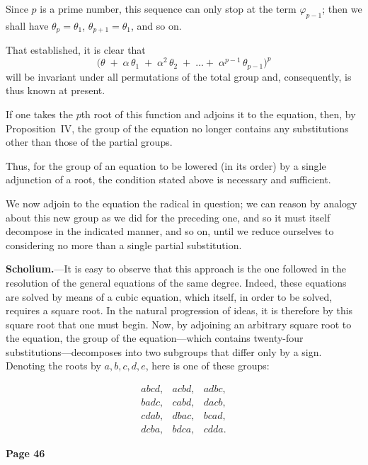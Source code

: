 \documentclass{article}
\begin{document}
\noindent
Since $p$ is a prime number, this sequence can only stop at the term $\varphi_{p-1}$; then we shall have $\theta_{p} = \theta_{1}$, $\theta_{p+1} = \theta_{1}$, and so on.

\noindent
That established, it is clear that
\[
\bigl(\theta \;+\; \alpha\,\theta_{1}\;+\;\alpha^{2}\,\theta_{2}\;+\;\dots+\;\alpha^{p-1}\,\theta_{p-1}\bigr)^{p}
\]
will be invariant under all permutations of the total group and, consequently, is thus known at present.

\noindent
If one takes the $p$th root of this function and adjoins it to the equation, then, by Proposition~IV, the group of the equation no longer contains any substitutions other than those of the partial groups.

\noindent
Thus, for the group of an equation to be lowered (in its order) by a single adjunction of a root, the condition stated above is necessary and sufficient.

\noindent
We now adjoin to the equation the radical in question; we can reason by analogy about this new group as we did for the preceding one, and so it must itself decompose in the indicated manner, and so on, until we reduce ourselves to considering no more than a single partial substitution.

\medskip
\noindent
\textbf{Scholium.}---It is easy to observe that this approach is the one followed in the resolution of the general equations of the same degree. Indeed, these equations are solved by means of a cubic equation, which itself, in order to be solved, requires a square root. In the natural progression of ideas, it is therefore by this square root that one must begin. Now, by adjoining an arbitrary square root to the equation, the group of the equation---which contains twenty-four substitutions---decomposes into two subgroups that differ only by a sign. Denoting the roots by $a, b, c, d, e$, here is one of these groups:

\[
\begin{matrix}
abcd, & acbd, & adbc,\\ 
badc, & cabd, & dacb,\\ 
cdab, & dbac, & bcad,\\ 
dcba, & bdca, & cdda.
\end{matrix}
\]

\bigskip\bigskip




\newpage

\centerline{\textbf{Page 46}}
\end{document}
